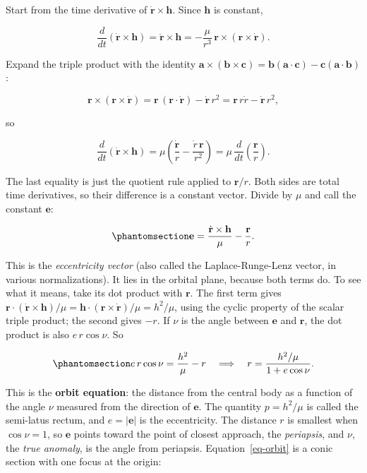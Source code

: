 \documentclass[
  10.5pt,
  letterpaper,
]{scrbook}
\theoremstyle{plain}
\theoremstyle{remark}
\begin{document}
Start from the time derivative of \(\dot{\mathbf{r}}\times\mathbf{h}\).
Since \(\mathbf{h}\) is constant,

\[
\frac{d}{dt}\left(\dot{\mathbf{r}}\times\mathbf{h}\right) = \ddot{\mathbf{r}}\times\mathbf{h}
= -\frac{\mu}{r^3}\,\mathbf{r}\times(\mathbf{r}\times\dot{\mathbf{r}}).
\]

Expand the triple product with the identity
\(\mathbf{a}\times(\mathbf{b}\times\mathbf{c}) = \mathbf{b}(\mathbf{a}\cdot\mathbf{c}) - \mathbf{c}(\mathbf{a}\cdot\mathbf{b})\):

\[
\mathbf{r}\times(\mathbf{r}\times\dot{\mathbf{r}}) = \mathbf{r}\,(\mathbf{r}\cdot\dot{\mathbf{r}}) - \dot{\mathbf{r}}\,r^2
= \mathbf{r}\,r\dot{r} - \dot{\mathbf{r}}\,r^2,
\]

so

\[
\frac{d}{dt}\left(\dot{\mathbf{r}}\times\mathbf{h}\right)
= \mu\left(\frac{\dot{\mathbf{r}}}{r} - \frac{\dot{r}\,\mathbf{r}}{r^2}\right)
= \mu\,\frac{d}{dt}\left(\frac{\mathbf{r}}{r}\right).
\]

The last equality is just the quotient rule applied to \(\mathbf{r}/r\).
Both sides are total time derivatives, so their difference is a constant
vector. Divide by \(\mu\) and call the constant \(\mathbf{e}\):

\begin{equation}\protect\phantomsection\label{eq-ecc-vector}{
\mathbf{e} = \frac{\dot{\mathbf{r}}\times\mathbf{h}}{\mu} - \frac{\mathbf{r}}{r}.
}\end{equation}

This is the \emph{eccentricity vector} (also called the
Laplace-Runge-Lenz vector, in various normalizations). It lies in the
orbital plane, because both terms do. To see what it means, take its dot
product with \(\mathbf{r}\). The first term gives
\(\mathbf{r}\cdot(\dot{\mathbf{r}}\times\mathbf{h})/\mu = \mathbf{h}\cdot(\mathbf{r}\times\dot{\mathbf{r}})/\mu = h^2/\mu\),
using the cyclic property of the scalar triple product; the second gives
\(-r\). If \(\nu\) is the angle between \(\mathbf{e}\) and
\(\mathbf{r}\), the dot product is also \(e\,r\cos\nu\). So

\begin{equation}\protect\phantomsection\label{eq-orbit}{
e\,r\cos\nu = \frac{h^2}{\mu} - r
\quad\Longrightarrow\quad
r = \frac{h^2/\mu}{1 + e\cos\nu}.
}\end{equation}

This is the \textbf{orbit equation}: the distance from the central body
as a function of the angle \(\nu\) measured from the direction of
\(\mathbf{e}\). The quantity \(p = h^2/\mu\) is called the semi-latus
rectum, and \(e = |\mathbf{e}|\) is the eccentricity. The distance \(r\)
is smallest when \(\cos\nu = 1\), so \(\mathbf{e}\) points toward the
point of closest approach, the \emph{periapsis}, and \(\nu\), the
\emph{true anomaly}, is the angle from periapsis.
Equation~\ref{eq-orbit} is a conic section with one focus at the origin:
\end{document}
